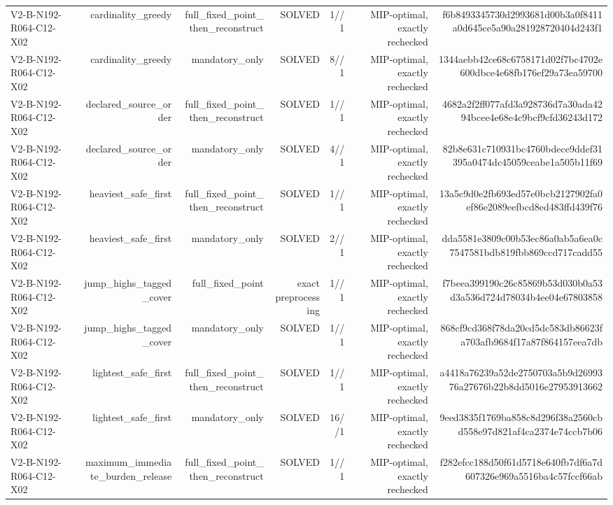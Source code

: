 {\begin{longtable}{lrrrrrr}
V2-B-N192-R064-C12-X02 & cardinality\_greedy & full\_fixed\_point\_then\_reconstruct & SOLVED & 1//1 & MIP-optimal, exactly rechecked & f6b8493345730d2993681d00b3a0f8411a0d645ce5a90a281928720404d243f1 \\
V2-B-N192-R064-C12-X02 & cardinality\_greedy & mandatory\_only & SOLVED & 8//1 & MIP-optimal, exactly rechecked & 1344aebb42ce68c6758171d02f7bc4702e600dbce4e68fb176ef29a73ea59700 \\
V2-B-N192-R064-C12-X02 & declared\_source\_order & full\_fixed\_point\_then\_reconstruct & SOLVED & 1//1 & MIP-optimal, exactly rechecked & 4682a2f2ff077afd3a928736d7a30ada4294bcee4e68e4c9bcf9cfd36243d172 \\
V2-B-N192-R064-C12-X02 & declared\_source\_order & mandatory\_only & SOLVED & 4//1 & MIP-optimal, exactly rechecked & 82b8e631c710931bc4760bdece9ddef31395a0474dc45059ceabe1a505b11f69 \\
V2-B-N192-R064-C12-X02 & heaviest\_safe\_first & full\_fixed\_point\_then\_reconstruct & SOLVED & 1//1 & MIP-optimal, exactly rechecked & 13a5c9d0e2fb693ed57e0bcb2127902fa0ef86e2089eefbcd8ed483ffd439f76 \\
V2-B-N192-R064-C12-X02 & heaviest\_safe\_first & mandatory\_only & SOLVED & 2//1 & MIP-optimal, exactly rechecked & dda5581e3809c00b53ec86a0ab5a6ea0c7547581bdb819fbb869ccd717cadd55 \\
V2-B-N192-R064-C12-X02 & jump\_highs\_tagged\_cover & full\_fixed\_point & exact preprocessing & 1//1 & MIP-optimal, exactly rechecked & f7beea399190c26c85869b53d030b0a53d3a536d724d78034b4ee04e67803858 \\
V2-B-N192-R064-C12-X02 & jump\_highs\_tagged\_cover & mandatory\_only & SOLVED & 1//1 & MIP-optimal, exactly rechecked & 868cf9cd368f78da20cd5dc583db86623fa703afb9684f17a87f864157eea7db \\
V2-B-N192-R064-C12-X02 & lightest\_safe\_first & full\_fixed\_point\_then\_reconstruct & SOLVED & 1//1 & MIP-optimal, exactly rechecked & a4418a76239a52de2750703a5b9d2699376a27676b22b8dd5016e27953913662 \\
V2-B-N192-R064-C12-X02 & lightest\_safe\_first & mandatory\_only & SOLVED & 16//1 & MIP-optimal, exactly rechecked & 9eed3835f1769ba858c8d296f38a2560cbd558e97d821af4ca2374e74ccb7b06 \\
V2-B-N192-R064-C12-X02 & maximum\_immediate\_burden\_release & full\_fixed\_point\_then\_reconstruct & SOLVED & 1//1 & MIP-optimal, exactly rechecked & f282efcc188d50f61d5718e640fb7df6a7d607326e969a5516ba4c57fccf66ab \\

\end{longtable}}
